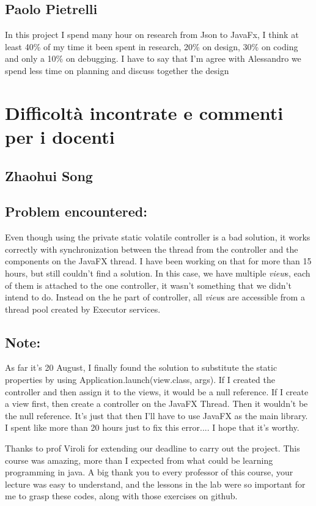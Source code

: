 \documentclass[a4paper,12pt]{report}
\begin{document}
\subsection*{Paolo Pietrelli}
In this project I spend many hour on research from Json to JavaFx, I think at least 40\% of my time it been spent in research, 20\% on design, 30\% on coding and only a 10\% on debugging.
I have to say that I'm agree with Alessandro we spend less time on planning and discuss together the design 

\section{Difficoltà incontrate e commenti per i docenti}
\subsection*{Zhaohui Song}

\subsection*{Problem encountered:}

Even though using the private static volatile controller is a bad solution, it works correctly with synchronization between the thread from the controller and the components on the JavaFX thread. 
I have been working on that for more than 15 hours, but still couldn't find a solution. In this case, we have multiple \textit{view}s, each of them is attached to the one controller, it wasn't something that we didn't intend to do.
Instead on the he part of controller, all \textit{view}s are accessible from a thread pool created by Executor services. 

\subsection*{Note:}
As far it's 20 August, I finally found the solution to substitute the static properties by using Application.launch(view.class, args). If I created the controller and then assign it to the views, it would be a null reference. If I create a view first, then create a controller on the JavaFX Thread. Then it wouldn't be the null reference. It's just that then I'll have to use JavaFX as the main library.
I spent like more than 20 hours just to fix this error.... I hope that it's worthy.

Thanks to prof Viroli for extending our deadline to carry out the project.
%
This course was amazing, more than I expected from what could be learning programming in java. 
%
A big thank you to every professor of this course, your lecture was easy to understand, and the lessons in the lab were so important for me to grasp these codes, along with those exercises on github.
\end{document}
